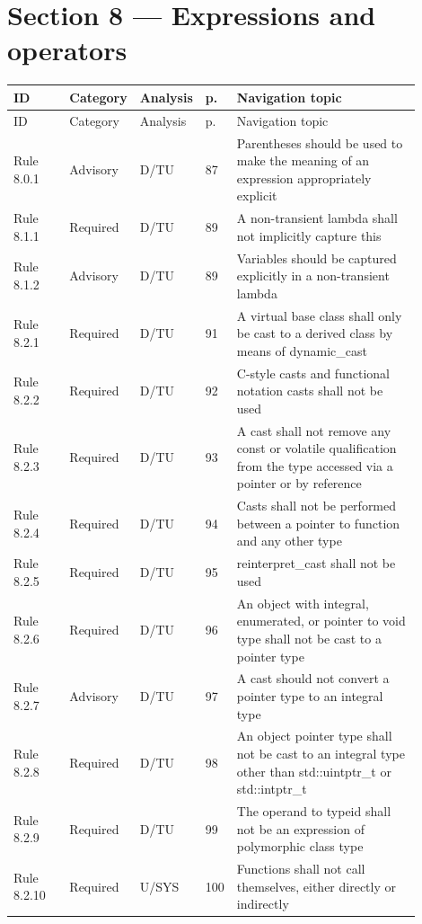 \documentclass[10pt,letterpaper]{article}
\begin{document}
\section{Section 8 --- Expressions and operators}
\small\setlength{\tabcolsep}{3pt}\renewcommand{\arraystretch}{1.15}
\begin{longtable}{p{0.14\linewidth}p{0.14\linewidth}p{0.1\linewidth}p{0.045\linewidth}p{0.475\linewidth}}
\toprule
ID & Category & Analysis & p. & Navigation topic\\ \midrule
\endfirsthead
\toprule
ID & Category & Analysis & p. & Navigation topic\\ \midrule
\endhead
Rule 8.0.1 & Advisory & D/TU & 87 & Parentheses should be used to make the meaning of an expression appropriately explicit\\
Rule 8.1.1 & Required & D/TU & 89 & A non-transient lambda shall not implicitly capture this\\
Rule 8.1.2 & Advisory & D/TU & 89 & Variables should be captured explicitly in a non-transient lambda\\
Rule 8.2.1 & Required & D/TU & 91 & A virtual base class shall only be cast to a derived class by means of dynamic\_cast\\
Rule 8.2.2 & Required & D/TU & 92 & C-style casts and functional notation casts shall not be used\\
Rule 8.2.3 & Required & D/TU & 93 & A cast shall not remove any const or volatile qualification from the type accessed via a pointer or by reference\\
Rule 8.2.4 & Required & D/TU & 94 & Casts shall not be performed between a pointer to function and any other type\\
Rule 8.2.5 & Required & D/TU & 95 & reinterpret\_cast shall not be used\\
Rule 8.2.6 & Required & D/TU & 96 & An object with integral, enumerated, or pointer to void type shall not be cast to a pointer type\\
Rule 8.2.7 & Advisory & D/TU & 97 & A cast should not convert a pointer type to an integral type\\
Rule 8.2.8 & Required & D/TU & 98 & An object pointer type shall not be cast to an integral type other than std::uintptr\_t or std::intptr\_t\\
Rule 8.2.9 & Required & D/TU & 99 & The operand to typeid shall not be an expression of polymorphic class type\\
Rule 8.2.10 & Required & U/SYS & 100 & Functions shall not call themselves, either directly or indirectly\\

\end{longtable}
\end{document}
